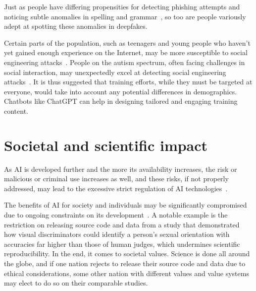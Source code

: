 Just as people have differing propensities for detecting phishing attempts and noticing subtle anomalies in spelling and grammar~\citep{nicholson_Investigating_Teenagers_Detect_Phishing_2020, neupane_Social_Disorders_Facilitate_SE_2018}, so too are people variously adept at spotting these anomalies in deepfakes.

%
%
Certain parts of the population, such as teenagers and young people who haven't yet gained enough experience on the Internet, may be more susceptible to social engineering attacks~\citep{nicholson_Investigating_Teenagers_Detect_Phishing_2020}. People on the autism spectrum, often facing challenges in social interaction, may unexpectedly excel at detecting social engineering attacks~\citep{neupane_Social_Disorders_Facilitate_SE_2018}. It is thus suggested that training efforts, while they must be targeted at everyone, would take into account any potential differences in demographics. Chatbots like ChatGPT can help in designing tailored and engaging training content.





\section{Societal and scientific impact}
\begin{comment}
\end{comment}
As AI is developed further and the more its availability increases, the risk or malicious or criminal use increases as well, and these risks, if not properly addressed, may lead to the excessive strict regulation of AI technologies~\citep{king_AI_Crime_Interdisciplinary_Analysis_2019}.

The benefits of AI for society and individuals may be significantly compromised due to ongoing constraints on its development~\citep{king_AI_Crime_Interdisciplinary_Analysis_2019}. A notable example is the restriction on releasing source code and data from a study that demonstrated how visual discriminators could identify a person's sexual orientation with accuracies far higher than those of human judges, which undermines scientific reproducibility. In the end, it comes to societal values. Science is done all around the globe, and if one nation rejects to release their source code and data due to ethical considerations, some other nation with different values and value systems may elect to do so on their comparable studies.

